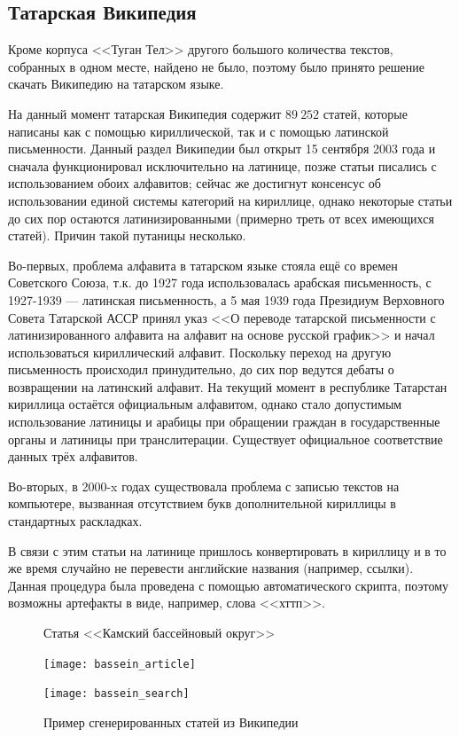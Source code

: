 \subsection{Татарская Википедия}

Кроме корпуса <<Туган Тел>> другого большого количества текстов, собранных в одном месте, найдено не было, поэтому было принято решение скачать Википедию на татарском языке.

На данный момент татарская Википедия содержит $89\ 252$ статей, которые написаны как с помощью кириллической, так и с помощью латинской письменности. Данный раздел Википедии был открыт 15 сентября 2003 года и сначала функционировал исключительно на латинице, позже статьи писались с использованием обоих алфавитов; сейчас же достигнут консенсус об использовании единой системы категорий на кириллице, однако некоторые статьи до сих пор остаются латинизированными (примерно треть от всех имеющихся статей). Причин такой путаницы несколько. 

Во-первых, проблема алфавита в татарском языке стояла ещё со времен Советского Союза, т.к. до 1927 года использовалась арабская письменность, с 1927-1939 --- латинская письменность, а 5 мая 1939 года Президиум Верховного Совета Татарской АССР принял указ <<О переводе татарской письменности с латинизированного алфавита на алфавит на основе русской график>> и начал использоваться кириллический алфавит. Поскольку переход на другую письменность происходил принудительно, до сих пор ведутся дебаты о возвращении на латинский алфавит. На текущий момент в республике Татарстан кириллица остаётся официальным алфавитом, однако стало допустимым использование латиницы и арабицы при обращении граждан в государственные органы и латиницы при транслитерации. Существует официальное соответствие данных трёх алфавитов.

Во-вторых, в 2000-x годах существовала проблема с записью текстов на компьютере, вызванная отсутствием букв дополнительной кириллицы в стандартных раскладках.

В связи с этим статьи на латинице пришлось конвертировать в кириллицу и в то же время случайно не перевести английские названия (например, ссылки). Данная процедура была проведена с помощью автоматического скрипта, поэтому возможны артефакты в виде, например, слова <<хттп>>.

\begin{figure}[H]
\begin{minipage}{\textwidth}
\caption{Статья <<Камский бассейновый округ>>}
\texttt{[image: bassein\_article]}
\label{fig:bassein_article}
\end{minipage}

\begin{minipage}{\textwidth}
\caption{Пример сгенерированных статей из Википедии}
\texttt{[image: bassein\_search]}
\label{fig:bassein_search}
\end{minipage}
\end{figure}


